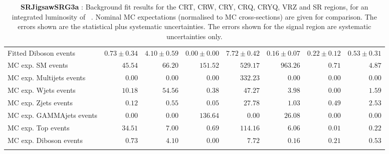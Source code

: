 \begin{table}
\begin{center}
{\begin{tabular*}{\textwidth}{@{\extracolsep{\fill}}lrrrrrrr}
        Fitted Diboson events         & $0.73 \pm 0.34$          & $4.10 \pm 0.59$          & $0.00 \pm 0.00$          & $7.72 \pm 0.42$          & $0.16 \pm 0.07$          & $0.22 \pm 0.12$          & $0.53 \pm 0.31$              \\
 \noalign{\smallskip}\hline\noalign{\smallskip}
MC exp. SM events              & $45.54$          & $66.20$          & $151.52$          & $529.17$          & $963.26$          & $0.71$          & $4.87$              \\
\noalign{\smallskip}\hline\noalign{\smallskip}
        MC exp. Multijets events         & $0.00$          & $0.00$          & $0.00$          & $332.23$          & $0.00$          & $0.00$          & $0.00$              \\
        MC exp. Wjets events         & $10.18$          & $54.56$          & $0.38$          & $47.27$          & $3.98$          & $0.00$          & $1.59$              \\
        MC exp. Zjets events         & $0.12$          & $0.55$          & $0.05$          & $27.78$          & $1.03$          & $0.49$          & $2.53$              \\
        MC exp. GAMMAjets events         & $0.00$          & $0.00$          & $136.64$          & $0.00$          & $26.08$          & $0.00$          & $0.00$              \\
        MC exp. Top events         & $34.51$          & $7.00$          & $0.69$          & $114.16$          & $6.06$          & $0.01$          & $0.22$              \\
        MC exp. Diboson events         & $0.73$          & $4.10$          & $0.00$          & $7.72$          & $0.16$          & $0.21$          & $0.53$              \\
\noalign{\smallskip}\hline\noalign{\smallskip}
\end{tabular*}
}
\end{center}
\caption{{\bf SRJigsawSRG3a} : Background fit results for the CRT, CRW, CRY, CRQ, CRYQ, VRZ and SR regions, for an integrated luminosity of \ourintlumi~\ifb. Nominal MC expectations (normalised to MC cross-sections) are given for comparison. The errors shown are the statistical plus systematic uncertainties. The errors shown for the signal region are systematic uncertainties only.}
\label{table.results.systematics.in.logL.fit.CRT.CRW.CRY.CRQ.CRYQ.VRZ.SR.SRJigsawSRG3a}
\end{table}
%